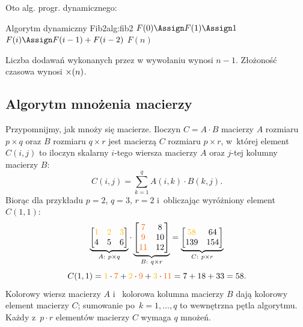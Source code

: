 Oto alg. progr. dynamicznego:
\begin{alg}{Algorytm dynamiczny Fib2}{alg:fib2}
	 
	 
	\EndIf
	\State $F(0) \Assign F(1) \Assign 1$
	\State $F(i) \Assign F(i - 1) + F(i - 2)$
	\EndFor
	\State \Return $F(n)$
	\EndFunction
\end{alg}

Liczba dodawań wykonanych przez  w wywołaniu  wynosi $n - 1$.
Złożoność czasowa wynosi $\mathcal{\Theta}(n)$.

\subsection{Algorytm mnożenia macierzy}

Przypomnijmy, jak mnoży się macierze. Iloczyn $C = A \cdot B$ macierzy $A$ rozmiaru $p \times q$
oraz $B$ rozmiaru $q \times r$ jest macierzą $C$ rozmiaru $p \times r$, w~której element $C(i, j)$
to iloczyn skalarny $i$-tego wiersza macierzy $A$ oraz $j$-tej kolumny macierzy $B$:
\[
	C(i, j) = \sum_{k = 1}^{q} A(i, k) \cdot B(k, j).
\]
Biorąc dla przykładu $p = 2$, $q = 3$, $r = 2$ i~obliczając wyróżniony element $C(1, 1)$:
\[
	\underbrace{\begin{bmatrix}
			{\color{accentA}1} & {\color{accentA}2} & {\color{accentA}3} \\
			4                  & 5                  & 6
		\end{bmatrix}}_{A:\ p \times q}
	\cdot
	\underbrace{\begin{bmatrix}
			{\color{accentB}7}  & 8  \\
			{\color{accentB}9}  & 10 \\
			{\color{accentB}11} & 12
		\end{bmatrix}}_{B:\ q \times r}
	=
	\underbrace{\begin{bmatrix}
			{\color{accentA}58} & 64  \\
			139                 & 154
		\end{bmatrix}}_{C:\ p \times r}
\]
\[
	C(1, 1) = {\color{accentA}1} \cdot {\color{accentB}7} + {\color{accentA}2} \cdot {\color{accentB}9}
	+ {\color{accentA}3} \cdot {\color{accentB}11} = 7 + 18 + 33 = 58.
\]
Kolorowy wiersz macierzy $A$ i~ kolorowa kolumna macierzy $B$ dają kolorowy element macierzy $C$;
sumowanie po~$k = 1, \dots, q$ to wewnętrzna pętla algorytmu. Każdy z~$p \cdot r$ elementów macierzy
$C$ wymaga $q$ mnożeń.

